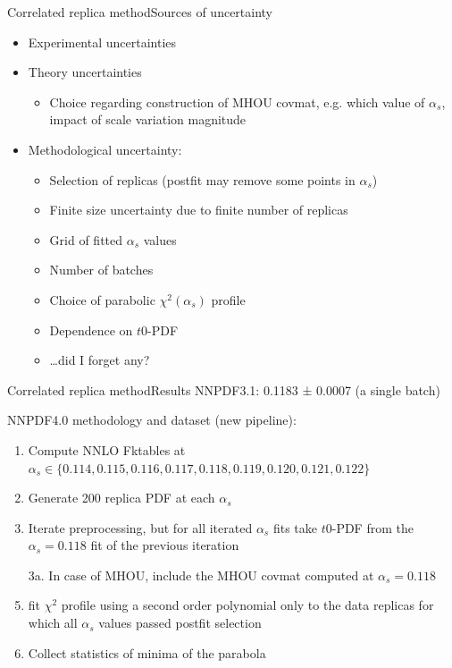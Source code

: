 \documentclass[aspectratio=169, 8pt,t]{beamer}
\begin{document}
\begin{frame}{Correlated replica method}{Sources of uncertainty}
  \begin{itemize}
    \item Experimental uncertainties
    \item Theory uncertainties
    \begin{itemize}
      \item Choice regarding construction of MHOU covmat, e.g. which value of $\alpha_s$, impact of scale variation magnitude
    \end{itemize}
    \item Methodological uncertainty:
    \begin{itemize}
      \item Selection of replicas (postfit may remove some points in $\alpha_s$)
      \item Finite size uncertainty due to finite number of replicas
      \item Grid of fitted $\alpha_s$ values
      \item Number of batches
      \item Choice of parabolic $\chi^2(\alpha_s)$ profile
      \item Dependence on $t0$-PDF
      \item \ldots did I forget any?
    \end{itemize}
  \end{itemize}
\end{frame}


\begin{frame}{Correlated replica method}{Results}
  NNPDF3.1: 0.1183 ± 0.0007 (a single batch)

  \vspace*{1em}
  NNPDF4.0 methodology and dataset (new pipeline):
  \begin{enumerate}
    \item Compute NNLO Fktables at $\alpha_s\in \{0.114,0.115,0.116,0.117,0.118,0.119,0.120,0.121,0.122\}$
    \item Generate 200 replica PDF at each $\alpha_s$
    \item Iterate preprocessing, but for all iterated $\alpha_s$ fits take $t0$-PDF from the $\alpha_s=0.118$ fit of the previous iteration
    \item[3a.] In case of MHOU, include the MHOU covmat computed at $\alpha_s=0.118$
    \item fit $\chi^2$ profile using a second order polynomial only to the data replicas for which all $\alpha_s$ values passed postfit selection
    \item Collect statistics of minima of the parabola
  \end{enumerate}
\end{frame}
\end{document}
